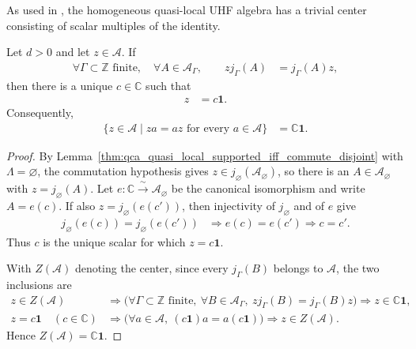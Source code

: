 As used in \cite{Cirac2017MPU,Gross2012IndexTheory,SchumacherWerner2004QCA}, the homogeneous quasi-local UHF algebra has a trivial center consisting of
scalar multiples of the
identity.

\begin{lemma}
    \label{thm:qca_quasi_local_center_scalar}
    \leanok
    Let $d>0$ and let $z\in\mathcal A$.  If
    \begin{align}
        \forall\Gamma\subset\mathbb Z\text{ finite},\quad
        \forall A\in\mathcal A_\Gamma,\qquad
        z j_\Gamma(A) & =j_\Gamma(A)z,
    \end{align}
    then there is a unique $c\in\mathbb C$ such that
    \begin{align}
        z & =c\mathbf 1.
    \end{align}
    Consequently,
    \begin{align}
        \{z\in\mathcal A\mid za=az\text{ for every }a\in\mathcal A\}
         & =\mathbb C\mathbf 1.
    \end{align}
\end{lemma}

\begin{proof}\leanok
    By Lemma~\ref{thm:qca_quasi_local_supported_iff_commute_disjoint}
    with $\Lambda=\varnothing$, the commutation hypothesis gives
    $z\in j_\varnothing(\mathcal A_\varnothing)$, so there is an
    $A\in\mathcal A_\varnothing$ with $z=j_\varnothing(A)$.  Let
    $e\colon\mathbb C\xrightarrow{\ \sim\ }\mathcal A_\varnothing$ be the
    canonical isomorphism and write $A=e(c)$.  If also
    $z=j_\varnothing(e(c'))$, then injectivity of $j_\varnothing$ and of $e$
    give
    \begin{align}
        j_\varnothing(e(c))=j_\varnothing(e(c'))
         & \Longrightarrow e(c)=e(c')
        \Longrightarrow c=c'.
    \end{align}
    Thus $c$ is the unique scalar for which $z=c\mathbf 1$.

    With $Z(\mathcal A)$ denoting the center, since every
    $j_\Gamma(B)$ belongs to $\mathcal A$, the two inclusions are
    \begin{align}
        z\in Z(\mathcal A)
         & \Longrightarrow
        \bigl(\forall \Gamma\subset\mathbb Z\text{ finite},\
        \forall B\in\mathcal A_\Gamma,\
        z j_\Gamma(B)=j_\Gamma(B)z\bigr)
        \Longrightarrow z\in\mathbb C\mathbf 1, \\
        z=c\mathbf 1\quad(c\in\mathbb C)
         & \Longrightarrow
        \bigl(\forall a\in\mathcal A,\
        (c\mathbf 1)a=a(c\mathbf 1)\bigr)
        \Longrightarrow z\in Z(\mathcal A).
    \end{align}
    Hence $Z(\mathcal A)=\mathbb C\mathbf 1$.
\end{proof}

